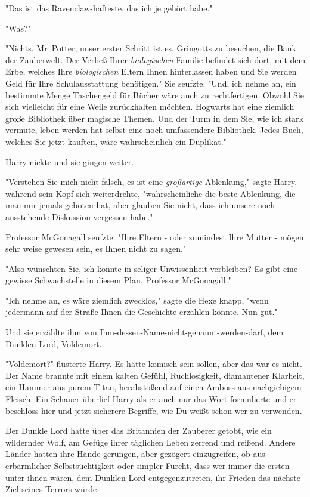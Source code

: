 {"Das ist das Ravenclaw-hafteste, das ich je gehört habe."

"Was?"

"Nichts. Mr~Potter, unser erster Schritt ist es, Gringotts zu besuchen, die Bank der Zauberwelt. Der Verließ Ihrer \emph{biologischen} Familie befindet sich dort, mit dem Erbe, welches Ihre \emph{biologischen} Eltern Ihnen hinterlassen haben und Sie werden Geld für Ihre Schulausstattung benötigen." Sie seufzte. "Und, ich nehme an, ein bestimmte Menge Taschengeld für Bücher wäre auch zu rechtfertigen. Obwohl Sie sich vielleicht für eine Weile zurückhalten möchten. Hogwarts hat eine ziemlich große Bibliothek über magische Themen. Und der Turm in dem Sie, wie ich stark vermute, leben werden hat selbst eine noch umfassendere Bibliothek. Jedes Buch, welches Sie jetzt kauften, wäre wahrscheinlich ein Duplikat."

Harry nickte und sie gingen weiter.

"Verstehen Sie mich nicht falsch, es ist eine \emph{großartige} Ablenkung," sagte Harry, während sein Kopf sich weiterdrehte, "wahrscheinliche die beste Ablenkung, die man mir jemals geboten hat, aber glauben Sie nicht, dass ich unsere noch ausstehende Diskussion vergessen habe."

Professor McGonagall seufzte. "Ihre Eltern - oder zumindest Ihre Mutter - mögen sehr weise gewesen sein, es Ihnen nicht zu sagen."

"Also wünschten Sie, ich könnte in seliger Unwissenheit verbleiben? Es gibt eine gewisse Schwachstelle in diesem Plan, Professor McGonagall."

"Ich nehme an, es wäre ziemlich zwecklos," sagte die Hexe knapp, "wenn jedermann auf der Straße Ihnen die Geschichte erzählen könnte. Nun gut."

Und sie erzählte ihm von Ihm-dessen-Name-nicht-genannt-werden-darf, dem Dunklen Lord, Voldemort.

"Voldemort?" flüsterte Harry. Es hätte komisch sein sollen, aber das war es nicht. Der Name brannte mit einem kalten Gefühl, Ruchlosigkeit, diamantener Klarheit, ein Hammer aus purem Titan, herabstoßend auf einen Amboss aus nachgiebigem Fleisch. Ein Schauer überlief Harry als er auch nur das Wort formulierte und er beschloss hier und jetzt sicherere Begriffe, wie Du-weißt-schon-wer zu verwenden.

Der Dunkle Lord hatte über das Britannien der Zauberer getobt, wie ein wildernder Wolf, am Gefüge ihrer täglichen Leben zerrend und reißend. Andere Länder hatten ihre Hände gerungen, aber gezögert einzugreifen, ob aus erbärmlicher Selbstsüchtigkeit oder simpler Furcht, dass wer immer die ersten unter ihnen wären, dem Dunklen Lord entgegenzutreten, ihr Frieden das nächste Ziel seines Terrors würde.

}
